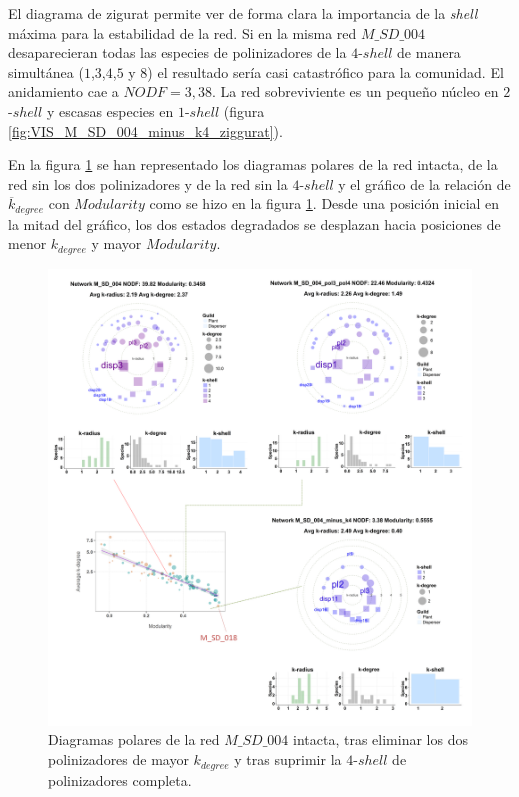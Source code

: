 El diagrama de zigurat permite ver de forma clara la importancia de la \textit{shell} máxima para la estabilidad de la red. Si en la misma red  $M\_SD\_004$ desaparecieran todas las especies de polinizadores de la $4$-$shell$ de manera simultánea ($1$,$3$,$4$,$5$ y $8$) el resultado sería casi catastrófico para la comunidad. El anidamiento cae a $NODF = 3,38$. La red sobreviviente es un pequeño núcleo en $2$-$shell$ y escasas especies en $1$-$shell$ (figura \ref{fig:VIS_M_SD_004_minus_k4_ziggurat}).

En la figura \ref{fig:VIS_Modvskdegree3-sd04} se han representado los diagramas polares de la red intacta, de la red sin los dos polinizadores y de la red sin la $4$-$shell$ y el gráfico de la relación de $\overline k_{degree}$ con $Modularity$ como se hizo en la figura \ref{fig:VIS_Modvskdegree3-sd04}. Desde una posición inicial en la mitad del gráfico, los dos estados degradados se desplazan hacia posiciones de menor $k_{degree}$ y mayor $Modularity$.

\begin{figure}[h!]
\centering
\includegraphics[scale=0.23]{Figures/VIS_Modvskdegree3-sd04.pdf}
\caption {Diagramas polares de la red $M\_SD\_004$ intacta, tras eliminar los dos polinizadores de mayor $k_{degree}$ y tras suprimir la $4$-$shell$ de polinizadores completa.} 
\label{fig:VIS_Modvskdegree3-sd04}
\end{figure}
 
